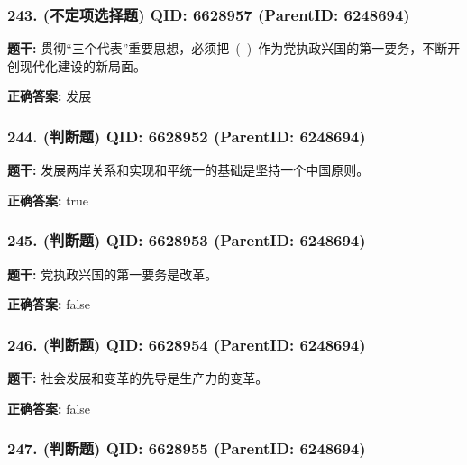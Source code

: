 \documentclass[12pt,UTF8]{ctexart}
\begin{document}
\subsubsection*{243. (不定项选择题) \small QID: 6628957 (ParentID: 6248694)}

\textbf{题干:}
贯彻“三个代表”重要思想，必须把 ( ) 作为党执政兴国的第一要务，不断开创现代化建设的新局面。



\textbf{正确答案:}
发展

\vspace{0.3em}\hrulefill\vspace{0.7em}

\subsubsection*{244. (判断题) \small QID: 6628952 (ParentID: 6248694)}

\textbf{题干:}
发展两岸关系和实现和平统一的基础是坚持一个中国原则。



\textbf{正确答案:}
true

\vspace{0.3em}\hrulefill\vspace{0.7em}

\subsubsection*{245. (判断题) \small QID: 6628953 (ParentID: 6248694)}

\textbf{题干:}
党执政兴国的第一要务是改革。



\textbf{正确答案:}
false

\vspace{0.3em}\hrulefill\vspace{0.7em}

\subsubsection*{246. (判断题) \small QID: 6628954 (ParentID: 6248694)}

\textbf{题干:}
社会发展和变革的先导是生产力的变革。



\textbf{正确答案:}
false

\vspace{0.3em}\hrulefill\vspace{0.7em}

\subsubsection*{247. (判断题) \small QID: 6628955 (ParentID: 6248694)}
\end{document}
